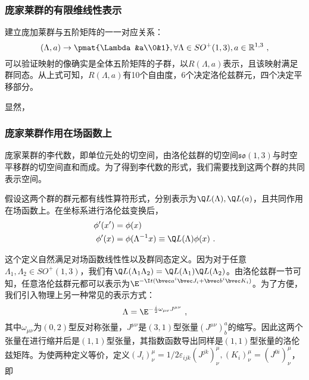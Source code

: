 \subsubsection{庞家莱群的有限维线性表示}

建立庞加莱群与五阶矩阵的一一对应关系：
\begin{equation}
(\Lambda,a)\rightarrow \pmat{\Lambda&a\\0&1},\forall \Lambda\in SO^+(1,3),a\in \mathbb R^{1,3}~,
\end{equation}
可以验证映射的像确实是全体五阶矩阵的子群，以$R(\Lambda,a)$表示，且该映射满足群同态。从上式可知，$R(\Lambda,a)$有10个自由度，6个决定洛伦兹群元，四个决定平移部分。

显然，



\subsubsection{庞家莱群作用在场函数上}
庞家莱群的李代数，即单位元处的切空间，由洛伦兹群的切空间$\mathfrak {so}(1,3)$与时空平移群的切空间直和而成。为了得到李代数的形式，我们需要找到这两个群的共同表示空间。

假设这两个群的群元都有线性算符形式，分别表示为$\Q L(\Lambda),\Q L(a)$，且共同作用在场函数上。在坐标系进行洛伦兹变换后，
\begin{equation}\label{eq_PoinGr_1}
\begin{aligned}
\phi'(x')&=\phi(x)\\
\phi'(x)&=\phi(\Lambda^{-1}x)\equiv \Q L(\Lambda)\phi(x)~.
\end{aligned}
\end{equation}

这个定义自然满足对场函数线性性以及群同态定义。因为对于任意$\Lambda_1,\Lambda_2\in SO^+(1,3)$，我们有$\Q L(\Lambda_1\Lambda_2)=\Q L(\Lambda_1)\Q L(\Lambda_2)$。由洛伦兹群一节可知，任意洛伦兹群元都可以表示为$\E^{-\I t(\bvec a^i\bvec J_i+\bvec b^i\bvec K_i)}$。为了方便，我们引入物理上另一种常见的表示方式：
\begin{equation}
\Lambda=\E^{-\frac{i}{2} \omega_{\mu \nu} J^{\mu \nu}}
~,
\end{equation}
其中$\omega_{\mu\nu}$为$(0,2)$型反对称张量，$J^{\mu\nu}$是$(3,1)$型张量$(J^{\mu\nu})^a_b$的缩写。因此这两个张量在进行缩并后是$(1,1)$型张量，其指数函数导出同样是$(1,1)$型张量的洛伦兹矩阵。为使两种定义等价，定义$(J_i)^{\mu}_{\nu}=1/2\varepsilon_{ijk}(J^{jk})^{\mu}_{\nu},(K_i)^{\mu}_{\nu}=(J^{0i})^{\mu}_{\nu}$，即

